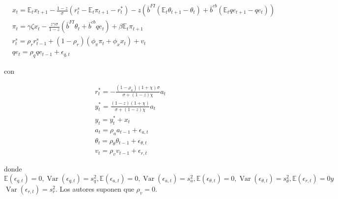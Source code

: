 \documentclass[10pt]{article}
\begin{document}
\begin{equation*}
\begin{aligned}
& x_{t}=\mathbb{E}_{t} x_{t+1}-\frac{1-z}{\sigma}\left(r_{t}^{s}-\mathbb{E}_{t} \pi_{t+1}-r_{t}^{*}\right)-z\left(\bar{b}^{F I}\left(\mathbb{E}_{t} \theta_{t+1}-\theta_{t}\right)+\bar{b}^{c b}\left(\mathbb{E}_{t} q e_{t+1}-q e_{t}\right)\right) \\
& \pi_{t}=\gamma \zeta x_{t}-\frac{z \gamma \sigma}{1-z}\left(\bar{b}^{F I} \theta_{t}+\bar{b}^{c b} q e_{t}\right)+\beta \mathbb{E}_{t} \pi_{t+1} \\
& r_{t}^{s}=\rho_{r} r_{t-1}^{s}+\left(1-\rho_{r}\right)\left(\phi_{\pi} \pi_{t}+\phi_{x} x_{t}\right)+v_{t} \\
& q e_{t}=\rho_{q} q e_{t-1}+\epsilon_{q, t}
\end{aligned}
\end{equation*}

con

\begin{equation*}
\begin{aligned}
& r_{t}^{*}=-\frac{\left(1-\rho_{a}\right)(1+\chi) \sigma}{\sigma+(1-z) \chi} a_{t} \\
& y_{t}^{*}=\frac{(1-z)(1+\chi)}{\sigma+(1-z) \chi} a_{t} \\
& y_{t}=y_{t}^{*}+x_{t} \\
& a_{t}=\rho_{a} a_{t-1}+\epsilon_{a, t} \\
& \theta_{t}=\rho_{\theta} \theta_{t-1}+\epsilon_{\theta, t} \\
& v_{t}=\rho_{v} v_{t-1}+\epsilon_{r, t}
\end{aligned}
\end{equation*}

donde $\mathbb{E}\left(\epsilon_{q, t}\right)=0, \operatorname{Var}\left(\epsilon_{q, t}\right)=s_{q}^{2}, \mathbb{E}\left(\epsilon_{a, t}\right)=0, \operatorname{Var}\left(\epsilon_{a, t}\right)=s_{a}^{2}, \mathbb{E}\left(\epsilon_{\theta, t}\right)=0, \operatorname{Var}\left(\epsilon_{\theta, t}\right)=s_{\theta}^{2}, \mathbb{E}\left(\epsilon_{r, t}\right)=0 y$ $\operatorname{Var}\left(\epsilon_{r, t}\right)=s_{r}^{2}$. Los autores suponen que $\rho_{v}=0$.
\end{document}
